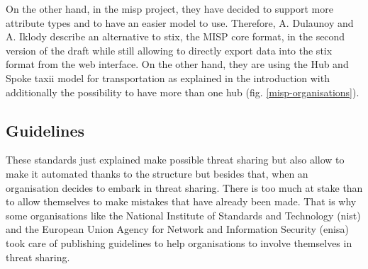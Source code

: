 \documentclass{eplmastersthesis}
\begin{document}
On the other hand, in the \gls{misp} project, they have decided to support more attribute types and to have an easier model to use. Therefore, A. Dulaunoy and A. Iklody describe an alternative to \gls{stix}, the MISP core format, in the second version of the draft\cite{MispDraft} while still allowing to directly export data into the \gls{stix} format from the web interface. On the other hand, they are using the Hub and Spoke \gls{taxii} model for transportation as explained in the introduction with additionally the possibility to have more than one hub (fig. \ref{misp-organisations}).

\subsection{Guidelines}
These standards just explained make possible threat sharing but also allow to make it automated thanks to the structure but besides that, when an organisation decides to embark in threat sharing. There is too much at stake than to allow themselves to make mistakes that have already been made. That is why some organisations like the National Institute of Standards and Technology (\gls{nist}) and the European Union Agency for Network and Information Security (\gls{enisa}) took care of publishing guidelines to help organisations to involve themselves in threat sharing.\\
\end{document}
